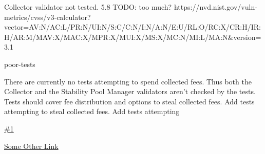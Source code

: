 \vuln
    { %
      Collector validator not tested.
    }
    { %
      5.8 TODO: too much?
    }
    { %
    https://nvd.nist.gov/vuln-metrics/cvss/v3-calculator?vector=AV:N/AC:L/PR:N/UI:N/S:C/C:N/I:N/A:N/E:U/RL:O/RC:X/CR:H/IR:H/AR:M/MAV:X/MAC:X/MPR:X/MUI:X/MS:X/MC:N/MI:L/MA:N&version=3.1
    }
    { %
    \item poor-tests
    }
    { %
    There are currently no tests attempting to spend collected fees. Thus both the Collector and the Stability Pool Manager validators aren't checked by the tests.
    Tests should cover fee distribution and options to steal collected fees.
    }
    { %
      Add tests attempting to steal collected fees. Add tests attempting
    }
    { %
    \item\href{github.com}{\#1}
    \item\href{github.com}{Some Other Link}
    }
